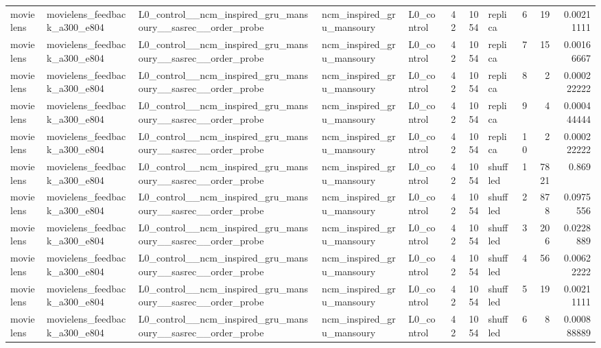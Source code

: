 \begin{table}[htbp!]
\begin{tabular}{lllllrrlrrr}
movielens & movielens\_feedback\_a300\_e804 & L0\_control\_\_ncm\_inspired\_gru\_mansoury\_\_sasrec\_\_order\_probe & ncm\_inspired\_gru\_mansoury & L0\_control & 42 & 1054 & replica & 6 & 19 & 0.00211111 \\
movielens & movielens\_feedback\_a300\_e804 & L0\_control\_\_ncm\_inspired\_gru\_mansoury\_\_sasrec\_\_order\_probe & ncm\_inspired\_gru\_mansoury & L0\_control & 42 & 1054 & replica & 7 & 15 & 0.00166667 \\
movielens & movielens\_feedback\_a300\_e804 & L0\_control\_\_ncm\_inspired\_gru\_mansoury\_\_sasrec\_\_order\_probe & ncm\_inspired\_gru\_mansoury & L0\_control & 42 & 1054 & replica & 8 & 2 & 0.000222222 \\
movielens & movielens\_feedback\_a300\_e804 & L0\_control\_\_ncm\_inspired\_gru\_mansoury\_\_sasrec\_\_order\_probe & ncm\_inspired\_gru\_mansoury & L0\_control & 42 & 1054 & replica & 9 & 4 & 0.000444444 \\
movielens & movielens\_feedback\_a300\_e804 & L0\_control\_\_ncm\_inspired\_gru\_mansoury\_\_sasrec\_\_order\_probe & ncm\_inspired\_gru\_mansoury & L0\_control & 42 & 1054 & replica & 10 & 2 & 0.000222222 \\
movielens & movielens\_feedback\_a300\_e804 & L0\_control\_\_ncm\_inspired\_gru\_mansoury\_\_sasrec\_\_order\_probe & ncm\_inspired\_gru\_mansoury & L0\_control & 42 & 1054 & shuffled & 1 & 7821 & 0.869 \\
movielens & movielens\_feedback\_a300\_e804 & L0\_control\_\_ncm\_inspired\_gru\_mansoury\_\_sasrec\_\_order\_probe & ncm\_inspired\_gru\_mansoury & L0\_control & 42 & 1054 & shuffled & 2 & 878 & 0.0975556 \\
movielens & movielens\_feedback\_a300\_e804 & L0\_control\_\_ncm\_inspired\_gru\_mansoury\_\_sasrec\_\_order\_probe & ncm\_inspired\_gru\_mansoury & L0\_control & 42 & 1054 & shuffled & 3 & 206 & 0.0228889 \\
movielens & movielens\_feedback\_a300\_e804 & L0\_control\_\_ncm\_inspired\_gru\_mansoury\_\_sasrec\_\_order\_probe & ncm\_inspired\_gru\_mansoury & L0\_control & 42 & 1054 & shuffled & 4 & 56 & 0.00622222 \\
movielens & movielens\_feedback\_a300\_e804 & L0\_control\_\_ncm\_inspired\_gru\_mansoury\_\_sasrec\_\_order\_probe & ncm\_inspired\_gru\_mansoury & L0\_control & 42 & 1054 & shuffled & 5 & 19 & 0.00211111 \\
movielens & movielens\_feedback\_a300\_e804 & L0\_control\_\_ncm\_inspired\_gru\_mansoury\_\_sasrec\_\_order\_probe & ncm\_inspired\_gru\_mansoury & L0\_control & 42 & 1054 & shuffled & 6 & 8 & 0.000888889 \\

\end{tabular}
\end{table}
